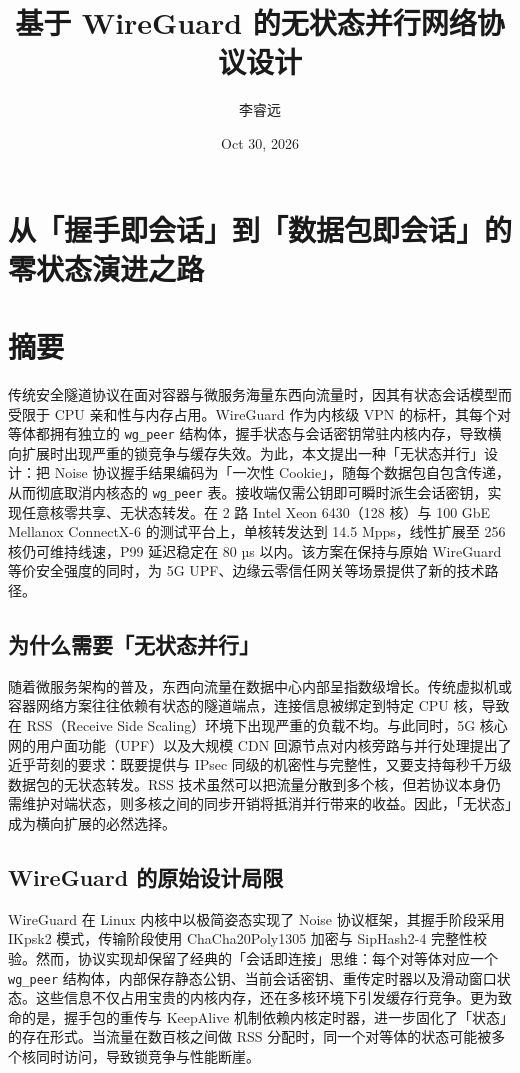 \title{基于 WireGuard 的无状态并行网络协议设计}
\author{李睿远}
\date{Oct 30, 2026}
\maketitle
\chapter{从「握手即会话」到「数据包即会话」的零状态演进之路}
\chapter{摘要}
传统安全隧道协议在面对容器与微服务海量东西向流量时，因其有状态会话模型而受限于 CPU 亲和性与内存占用。WireGuard 作为内核级 VPN 的标杆，其每个对等体都拥有独立的 \texttt{wg\_{}peer} 结构体，握手状态与会话密钥常驻内核内存，导致横向扩展时出现严重的锁竞争与缓存失效。为此，本文提出一种「无状态并行」设计：把 Noise 协议握手结果编码为「一次性 Cookie」，随每个数据包自包含传递，从而彻底取消内核态的 \texttt{wg\_{}peer} 表。接收端仅需公钥即可瞬时派生会话密钥，实现任意核零共享、无状态转发。在 2 路 Intel Xeon 6430（128 核）与 100 GbE Mellanox ConnectX-6 的测试平台上，单核转发达到 14.5 Mpps，线性扩展至 256 核仍可维持线速，P99 延迟稳定在 80 µs 以内。该方案在保持与原始 WireGuard 等价安全强度的同时，为 5G UPF、边缘云零信任网关等场景提供了新的技术路径。\par
\section{为什么需要「无状态并行」}
随着微服务架构的普及，东西向流量在数据中心内部呈指数级增长。传统虚拟机或容器网络方案往往依赖有状态的隧道端点，连接信息被绑定到特定 CPU 核，导致在 RSS（Receive Side Scaling）环境下出现严重的负载不均。与此同时，5G 核心网的用户面功能（UPF）以及大规模 CDN 回源节点对内核旁路与并行处理提出了近乎苛刻的要求：既要提供与 IPsec 同级的机密性与完整性，又要支持每秒千万级数据包的无状态转发。RSS 技术虽然可以把流量分散到多个核，但若协议本身仍需维护对端状态，则多核之间的同步开销将抵消并行带来的收益。因此，「无状态」成为横向扩展的必然选择。\par
\section{WireGuard 的原始设计局限}
WireGuard 在 Linux 内核中以极简姿态实现了 Noise 协议框架，其握手阶段采用 IKpsk2 模式，传输阶段使用 ChaCha20Poly1305 加密与 SipHash2-4 完整性校验。然而，协议实现却保留了经典的「会话即连接」思维：每个对等体对应一个 \texttt{wg\_{}peer} 结构体，内部保存静态公钥、当前会话密钥、重传定时器以及滑动窗口状态。这些信息不仅占用宝贵的内核内存，还在多核环境下引发缓存行竞争。更为致命的是，握手包的重传与 KeepAlive 机制依赖内核定时器，进一步固化了「状态」的存在形式。当流量在数百核之间做 RSS 分配时，同一个对等体的状态可能被多个核同时访问，导致锁竞争与性能断崖。\par
